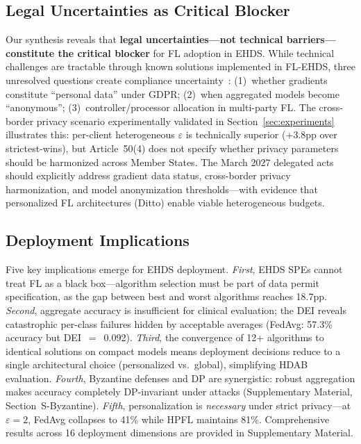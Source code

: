\documentclass[conference]{IEEEtran}
\begin{document}
\subsection{Legal Uncertainties as Critical Blocker}

Our synthesis reveals that \textbf{legal uncertainties---not technical barriers---constitute the critical blocker} for FL adoption in EHDS. While technical challenges are tractable through known solutions implemented in FL-EHDS, three unresolved questions create compliance uncertainty~\cite{quinn2024gdpr}: (1)~whether gradients constitute ``personal data'' under GDPR; (2)~when aggregated models become ``anonymous''; (3)~controller/processor allocation in multi-party FL. The cross-border privacy scenario experimentally validated in Section~\ref{sec:experiments} illustrates this: per-client heterogeneous $\varepsilon$ is technically superior ($+$3.8pp over strictest-wins), but Article~50(4) does not specify whether privacy parameters should be harmonized across Member States. The March 2027 delegated acts should explicitly address gradient data status, cross-border privacy harmonization, and model anonymization thresholds---with evidence that personalized FL architectures (Ditto) enable viable heterogeneous budgets.

\subsection{Deployment Implications}

Five key implications emerge for EHDS deployment. \textit{First}, EHDS SPEs cannot treat FL as a black box---algorithm selection must be part of data permit specification, as the gap between best and worst algorithms reaches 18.7pp. \textit{Second}, aggregate accuracy is insufficient for clinical evaluation; the DEI reveals catastrophic per-class failures hidden by acceptable averages (FedAvg: 57.3\% accuracy but DEI~$=$~0.092). \textit{Third}, the convergence of 12+ algorithms to identical solutions on compact models means deployment decisions reduce to a single architectural choice (personalized vs.\ global), simplifying HDAB evaluation. \textit{Fourth}, Byzantine defenses and DP are synergistic: robust aggregation makes accuracy completely DP-invariant under attacks (Supplementary Material, Section~S-Byzantine). \textit{Fifth}, personalization is \textit{necessary} under strict privacy---at $\varepsilon{=}2$, FedAvg collapses to 41\% while HPFL maintains 81\%. Comprehensive results across 16 deployment dimensions are provided in Supplementary Material.
\end{document}
